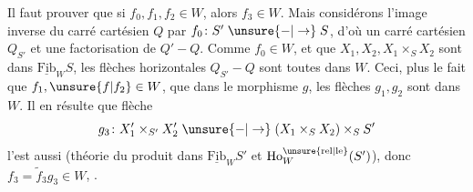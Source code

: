 
Il faut prouver que si $f_0,f_1,f_2\in W$, alors $f_3\in W$. Mais considérons l'image inverse du carré cartésien $Q$ par $f_0\colon S'\mathrel{\unsure{-|\to}}S$, d'où un carré cartésien $Q_{S'}$ et une factorisation
de $Q'\mathrel{-}Q$. Comme $f_0\in W$, et que $X_1,X_2,X_1\times_S X_2$ sont dans $\underline{\mathrm{Fib}}_W S$, les flèches horizontales  $Q_{S'}\mathrel{-}Q$ sont toutes dans $W$. Ceci, plus le fait que $f_1,\unsure{f|f_2}\in W$,  que dans le morphisme $g$, les flèches $g_1,g_2$ sont dans $W$. Il en résulte que  flèche
\[
g_3\colon X'_1\times_{S'}X'_2\mathrel{\unsure{-|\to}}(X_1\times_S X_2)\times_S S'
\]
l'est aussi (théorie du produit dans $\underline{\mathrm{Fib}}_W S'$ et $\mathrm{Ho}^{\unsure{\mathrm{rel}|\mathrm{le}}}_W(S')$), donc $f_3=\widetilde f_3g_3\in W$, .
